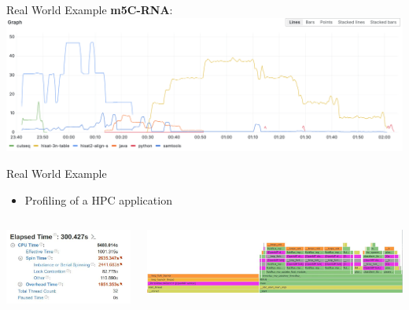 \begin{frame}{Real World Example}
  \textbf{m5C-RNA}:
  \includegraphics[width=\textwidth]{img/rna.png}
\end{frame}

\begin{frame}{Real World Example}
    \begin{itemize}
        \item Profiling of a HPC application
    \end{itemize}
    
    \begin{columns}
        \begin{column}{0.5\textwidth}
            \centering
            \includegraphics[width=\textwidth]{img/example1.jpg}
        \end{column}
        \begin{column}{0.5\textwidth}
            \centering
            \includegraphics[width=\textwidth]{img/example2.jpg}
        \end{column}
    \end{columns}
\end{frame}

